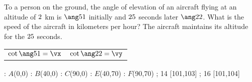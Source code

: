 

\DEGREESCOT\va\vm
\DEGREESCOT\vb\vn
\ROUND[2]\vm\vx
\ROUND[2]\vn\vy
\SUBTRACT\vn\vm\vz
\MULTIPLY\vh\vz\vd %
\ROUND[3]\vd\vj
\MULTIPLY{}\ve
\ROUND[2]\ve\vf
\DIVIDE\ve\vt\vr
\ROUND[2]\vr\vs

\question[3] To a person on the ground, the angle of elevation of an aircraft flying at an altitude of $2$ km 
is $\ang\va$ initially and $25$ seconds later $\ang\vb$. What is the speed of the
aircraft in kilometers per hour? The aircraft maintains its altitude for the $25$ seconds.

\watchout

\begin{calcaid}
  \begin{tabular}{c c}
    $\cot\ang\va=\vx$ & $\cot\ang\vb=\vy$ 
  \end{tabular}
\end{calcaid}

\ifprintanswers
  \begin{marginfigure}[-100pt]
      : $A$(0,0)
      : $B$(40,0)
      : $C$(90,0)
      : $E$(40,70)
      : $F$(90,70)
    \figdrawbegin{}
      \figdrawline [100,101,102,104,103,100]
      \figdrawline [100,103]
      \figdrawline [100,104]
      \figdrawline [103,101]
       ; 14 [101,103] 
       ; 16 [101,104] 
    \figdrawend
    \centerline{\box\figBoxA}
  \end{marginfigure}
\fi 

